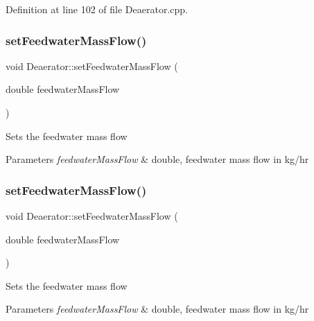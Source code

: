 Definition at line 102 of file Deaerator.\+cpp.

\mbox{\label{class_deaerator_ada95cb2557bc43602d7bcefbad66c853}} 
\subsubsection{\texorpdfstring{set\+Feedwater\+Mass\+Flow()}{setFeedwaterMassFlow()}\hspace{0.1cm}{\footnotesize\ttfamily [2/3]}}
{\footnotesize\ttfamily void Deaerator\+::set\+Feedwater\+Mass\+Flow (\begin{DoxyParamCaption}\item[{double}]{feedwater\+Mass\+Flow }\end{DoxyParamCaption})}

Sets the feedwater mass flow 
\begin{DoxyParams}{Parameters}
{\em feedwater\+Mass\+Flow} & double, feedwater mass flow in kg/hr \\
\hline
\end{DoxyParams}
\mbox{\label{class_deaerator_ada95cb2557bc43602d7bcefbad66c853}} 
\subsubsection{\texorpdfstring{set\+Feedwater\+Mass\+Flow()}{setFeedwaterMassFlow()}\hspace{0.1cm}{\footnotesize\ttfamily [3/3]}}
{\footnotesize\ttfamily void Deaerator\+::set\+Feedwater\+Mass\+Flow (\begin{DoxyParamCaption}\item[{double}]{feedwater\+Mass\+Flow }\end{DoxyParamCaption})}

Sets the feedwater mass flow 
\begin{DoxyParams}{Parameters}
{\em feedwater\+Mass\+Flow} & double, feedwater mass flow in kg/hr \\
\hline
\end{DoxyParams}
\mbox{\label{class_deaerator_a5936221e68b5ba3245f0adabed74e6d7}} 
